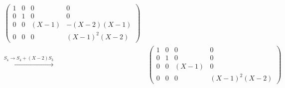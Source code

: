 \begin{align*}
\begin{pmatrix}
      1 & 0 &     0 &             0 \\
      0 & 1 &     0 &             0 \\
      0 & 0 & (X-1) &   -(X-2)(X-1) \\
      0 & 0 &     0 & (X-1)^2 (X-2)
    \end{pmatrix}
  \\
  \xrightarrow{S_4 \to S_4 + (X-2) S_3}&\,
    \begin{pmatrix}
      1 & 0 &     0 &             0 \\
      0 & 1 &     0 &             0 \\
      0 & 0 & (X-1) &             0 \\
      0 & 0 &     0 & (X-1)^2 (X-2)
    \end{pmatrix}
\end{align*}

